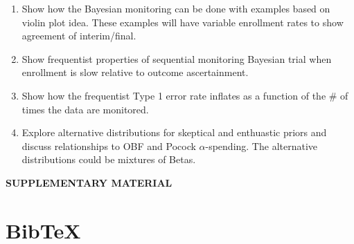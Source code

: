 \documentclass[12pt]{article}
\begin{document}
\begin{itemize}
\begin{enumerate}
\item Show how the Bayesian monitoring can be done with examples based on violin plot idea. These examples will have variable enrollment rates to show agreement of interim/final.
\item Show frequentist properties of sequential monitoring Bayesian trial when enrollment is slow relative to outcome ascertainment.
\item Show how the frequentist Type 1 error rate inflates as a function of the \# of times the data are monitored.
\item Explore alternative distributions for skeptical and enthuastic priors and discuss relationships to OBF and Pocock $\alpha$-spending. The alternative distributions could be mixtures of Betas.
\end{enumerate}
\end{itemize}

\newpage
\begin{center}
{\large\bf SUPPLEMENTARY MATERIAL}
\end{center}


\section{BibTeX}

 
 		
\end{document}
